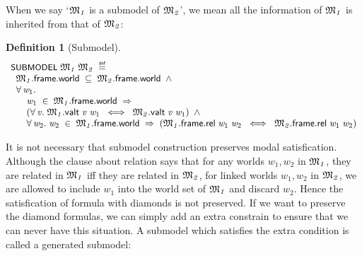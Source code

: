 \documentclass[letterpaper]{article}
\newtheorem{defn}{Definition}
\renewcommand{\HOLConst}[1]{{\textsf{\upshape\small #1}}}
\renewcommand{\HOLinline}[1]{\ensuremath{#1}}
\newenvironment{holmath}{\begin{displaymath}\begin{array}{l}}{\end{array}\end{displaymath}\ignorespacesafterend}
\begin{document}
When we say `\HOLinline{\HOLFreeVar{\ensuremath{\mathfrak{M}\sb{1}}}} is a submodel of \HOLinline{\HOLFreeVar{\ensuremath{\mathfrak{M}\sb{2}}}}', we mean all the information of \HOLinline{\HOLFreeVar{\ensuremath{\mathfrak{M}\sb{1}}}} is inherited from that of \HOLinline{\HOLFreeVar{\ensuremath{\mathfrak{M}\sb{2}}}}:
\begin{defn}[Submodel]
\begin{holmath}
  \HOLConst{SUBMODEL}\;\HOLFreeVar{\ensuremath{\mathfrak{M}\sb{1}}}\;\HOLFreeVar{\ensuremath{\mathfrak{M}\sb{2}}}\;\HOLSymConst{\HOLTokenDefEquality{}}\\
\;\;\HOLFreeVar{\ensuremath{\mathfrak{M}\sb{1}}}.\HOLFieldName{frame}.\HOLFieldName{world}\;\HOLSymConst{\HOLTokenSubset{}}\;\HOLFreeVar{\ensuremath{\mathfrak{M}\sb{2}}}.\HOLFieldName{frame}.\HOLFieldName{world}\;\HOLSymConst{\HOLTokenConj{}}\\
\;\;\HOLSymConst{\HOLTokenForall{}}\HOLBoundVar{w\sb{\mathrm{1}}}.\\
\;\;\;\;\;\;\HOLBoundVar{w\sb{\mathrm{1}}}\;\HOLSymConst{\HOLTokenIn{}}\;\HOLFreeVar{\ensuremath{\mathfrak{M}\sb{1}}}.\HOLFieldName{frame}.\HOLFieldName{world}\;\HOLSymConst{\HOLTokenImp{}}\\
\;\;\;\;\;\;(\HOLSymConst{\HOLTokenForall{}}\HOLBoundVar{v}.\;\HOLFreeVar{\ensuremath{\mathfrak{M}\sb{1}}}.\HOLFieldName{valt}\;\HOLBoundVar{v}\;\HOLBoundVar{w\sb{\mathrm{1}}}\;\HOLSymConst{\HOLTokenEquiv{}}\;\HOLFreeVar{\ensuremath{\mathfrak{M}\sb{2}}}.\HOLFieldName{valt}\;\HOLBoundVar{v}\;\HOLBoundVar{w\sb{\mathrm{1}}})\;\HOLSymConst{\HOLTokenConj{}}\\
\;\;\;\;\;\;\HOLSymConst{\HOLTokenForall{}}\HOLBoundVar{w\sb{\mathrm{2}}}.\;\HOLBoundVar{w\sb{\mathrm{2}}}\;\HOLSymConst{\HOLTokenIn{}}\;\HOLFreeVar{\ensuremath{\mathfrak{M}\sb{1}}}.\HOLFieldName{frame}.\HOLFieldName{world}\;\HOLSymConst{\HOLTokenImp{}}\;(\HOLFreeVar{\ensuremath{\mathfrak{M}\sb{1}}}.\HOLFieldName{frame}.\HOLFieldName{rel}\;\HOLBoundVar{w\sb{\mathrm{1}}}\;\HOLBoundVar{w\sb{\mathrm{2}}}\;\HOLSymConst{\HOLTokenEquiv{}}\;\HOLFreeVar{\ensuremath{\mathfrak{M}\sb{2}}}.\HOLFieldName{frame}.\HOLFieldName{rel}\;\HOLBoundVar{w\sb{\mathrm{1}}}\;\HOLBoundVar{w\sb{\mathrm{2}}})
\end{holmath}
\end{defn}

It is not necessary that submodel construction preserves modal satisfication. Although the clause about relation says that for any worlds $w_1,w_2$ in \HOLinline{\HOLFreeVar{\ensuremath{\mathfrak{M}\sb{1}}}}, they are related in \HOLinline{\HOLFreeVar{\ensuremath{\mathfrak{M}\sb{1}}}} iff they are related in \HOLinline{\HOLFreeVar{\ensuremath{\mathfrak{M}\sb{2}}}}, for linked worlds $w_1,w_2$ in \HOLinline{\HOLFreeVar{\ensuremath{\mathfrak{M}\sb{2}}}}, we are allowed to include $w_1$ into the world set of \HOLinline{\HOLFreeVar{\ensuremath{\mathfrak{M}\sb{1}}}} and discard $w_2$. Hence the satisfication of formula with diamonds is not preserved. If we want to preserve the diamond formulas, we can simply add an extra constrain to ensure that we can never have this situation. A submodel which satisfies the extra condition is called a generated submodel:
\end{document}
